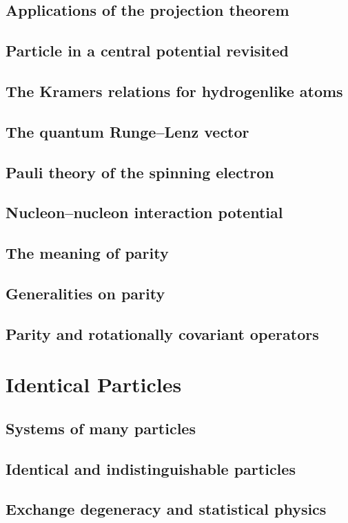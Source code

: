 \documentclass{article}
\begin{document}
\subsection{Applications of the projection theorem}
\subsection{Particle in a central potential revisited}
\subsection{The Kramers relations for hydrogenlike atoms}
\subsection{The quantum Runge–Lenz vector}
\subsection{Pauli theory of the spinning electron}
\subsection{Nucleon–nucleon interaction potential}
\subsection{The meaning of parity}
\subsection{Generalities on parity}
\subsection{Parity and rotationally covariant operators}

\section{Identical Particles}
\subsection{Systems of many particles}
\subsection{Identical and indistinguishable particles}
\subsection{Exchange degeneracy and statistical physics}
\end{document}
